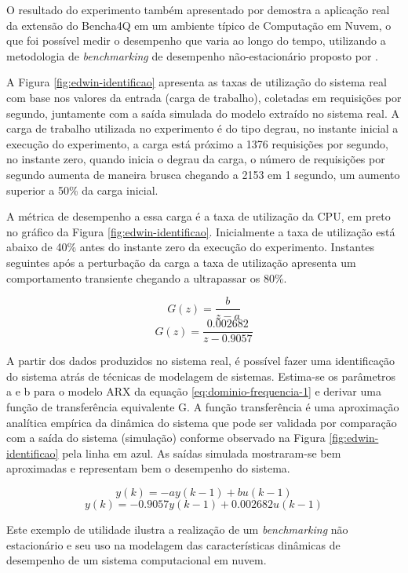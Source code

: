 O resultado do experimento também apresentado por  demostra a aplicação real da extensão do Bencha4Q em um ambiente típico de Computação em Nuvem, o que foi possível medir o desempenho que varia ao longo do tempo, utilizando a metodologia de \textit{benchmarking} de desempenho não-estacionário proposto por .

A Figura \ref{fig:edwin-identificao} apresenta as taxas de utilização do sistema real com base nos valores da entrada (carga de trabalho), coletadas em requisições por segundo, juntamente com a saída simulada do modelo extraído no sistema real. 
A carga de trabalho utilizada no experimento é do tipo degrau, no instante inicial a execução do experimento, a carga está próximo a 1376 requisições por segundo, no instante zero, quando inicia o degrau da carga, o número de requisições por segundo aumenta de maneira brusca chegando a 2153 em 1 segundo, um aumento superior a 50\% da carga inicial. 

A métrica de desempenho a essa carga é a taxa de utilização da CPU, em preto no gráfico da Figura \ref{fig:edwin-identificao}. Inicialmente a taxa de utilização está abaixo de 40\% antes do instante zero da execução do experimento. Instantes seguintes após a perturbação da carga a taxa de utilização apresenta um comportamento transiente chegando a ultrapassar os 80\%. 

\begin{equation} \label{eq:dominio-frequencia-1}
G(z) = \frac{b}{z - a}
\end{equation}
\begin{equation} \label{eq:dominio-frequencia-2}
G(z) = \frac{0.002682}{z - 0.9057}
\end{equation}

A partir dos dados produzidos no sistema real, é possível fazer uma identificação do sistema atrás de técnicas de modelagem de sistemas. Estima-se os parâmetros a e b para o modelo ARX da equação \ref{eq:dominio-frequencia-1} e derivar uma função de transferência equivalente G. A função transferência é uma aproximação analítica empírica da dinâmica do sistema que pode ser validada por comparação com a saída do sistema (simulação) conforme observado na Figura \ref{fig:edwin-identificao} pela linha em azul. As saídas simulada mostraram-se bem aproximadas e representam bem o desempenho do sistema.

\begin{equation} \label{eq:dominio-tempo-1}
y(k) = -ay(k-1) + bu(k-1)
\end{equation}
\begin{equation} \label{eq:dominio-tempo-2}
y(k) = -0.9057y(k-1) + 0.002682u(k-1)
\end{equation}

Este exemplo de utilidade ilustra a realização de um \textit{benchmarking} não estacionário e seu uso na modelagem das características dinâmicas de desempenho de um sistema computacional em nuvem.

